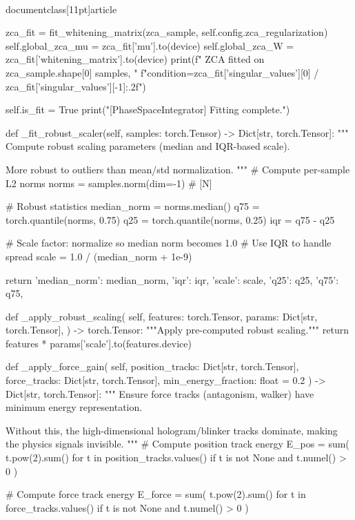 \\documentclass[11pt]{article}
\begin{document}
\begin{CodeBlock}
            zca_fit = fit_whitening_matrix(zca_sample, self.config.zca_regularization)
            self.global_zca_mu = zca_fit['mu'].to(device)
            self.global_zca_W = zca_fit['whitening_matrix'].to(device)
            print(f"  ZCA fitted on {zca_sample.shape[0]} samples, "
                  f"condition={zca_fit['singular_values'][0] / zca_fit['singular_values'][-1]:.2f}")

        self.is_fit = True
        print("[PhaseSpaceIntegrator] Fitting complete.")

    def _fit_robust_scaler(self, samples: torch.Tensor) -> Dict[str, torch.Tensor]:
        """
        Compute robust scaling parameters (median and IQR-based scale).

        More robust to outliers than mean/std normalization.
        """
        # Compute per-sample L2 norms
        norms = samples.norm(dim=-1)  # [N]

        # Robust statistics
        median_norm = norms.median()
        q75 = torch.quantile(norms, 0.75)
        q25 = torch.quantile(norms, 0.25)
        iqr = q75 - q25

        # Scale factor: normalize so median norm becomes 1.0
        # Use IQR to handle spread
        scale = 1.0 / (median_norm + 1e-9)

        return {
            'median_norm': median_norm,
            'iqr': iqr,
            'scale': scale,
            'q25': q25,
            'q75': q75,
        }

    def _apply_robust_scaling(
        self,
        features: torch.Tensor,
        params: Dict[str, torch.Tensor],
    ) -> torch.Tensor:
        """Apply pre-computed robust scaling."""
        return features * params['scale'].to(features.device)

    def _apply_force_gain(
        self,
        position_tracks: Dict[str, torch.Tensor],
        force_tracks: Dict[str, torch.Tensor],
        min_energy_fraction: float = 0.2
    ) -> Dict[str, torch.Tensor]:
        """
        Ensure force tracks (antagonism, walker) have minimum energy representation.

        Without this, the high-dimensional hologram/blinker tracks dominate,
        making the physics signals invisible.
        """
        # Compute position track energy
        E_pos = sum(
            t.pow(2).sum() for t in position_tracks.values()
            if t is not None and t.numel() > 0
        )

        # Compute force track energy
        E_force = sum(
            t.pow(2).sum() for t in force_tracks.values()
            if t is not None and t.numel() > 0
        )


\end{CodeBlock}
\end{document}
